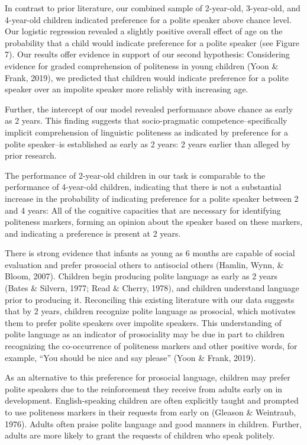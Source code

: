 \documentclass[
  english,
  man,floatsintext]{apa6}
\begin{document}
In contrast to prior literature, our combined sample of 2-year-old, 3-year-old, and 4-year-old children indicated preference for a polite speaker above chance level. Our logistic regression revealed a slightly positive overall effect of age on the probability that a child would indicate preference for a polite speaker (see Figure 7). Our results offer evidence in support of our second hypothesis: Considering evidence for graded comprehension of politeness in young children (Yoon \& Frank, 2019), we predicted that children would indicate preference for a polite speaker over an impolite speaker more reliably with increasing age.

Further, the intercept of our model revealed performance above chance as early as 2 years. This finding suggests that socio-pragmatic competence--specifically implicit comprehension of linguistic politeness as indicated by preference for a polite speaker--is established as early as 2 years: 2 years earlier than alleged by prior research.

The performance of 2-year-old children in our task is comparable to the performance of 4-year-old children, indicating that there is not a substantial increase in the probability of indicating preference for a polite speaker between 2 and 4 years: All of the cognitive capacities that are necessary for identifying politeness markers, forming an opinion about the speaker based on these markers, and indicating a preference is present at 2 years.

There is strong evidence that infants as young as 6 months are capable of social evaluation and prefer prosocial others to antisocial others (Hamlin, Wynn, \& Bloom, 2007). Children begin producing polite language as early as 2 years (Bates \& Silvern, 1977; Read \& Cherry, 1978), and children understand language prior to producing it. Reconciling this existing literature with our data suggests that by 2 years, children recognize polite language as prosocial, which motivates them to prefer polite speakers over impolite speakers. This understanding of polite language as an indicator of prosociality may be due in part to children recognizing the co-occurrence of politeness markers and other positive words, for example, ``You should be nice and say please'' (Yoon \& Frank, 2019).

As an alternative to this preference for prosocial language, children may prefer polite speakers due to the reinforcement they receive from adults early on in development. English-speaking children are often explicitly taught and prompted to use politeness markers in their requests from early on (Gleason \& Weintraub, 1976). Adults often praise polite language and good manners in children. Further, adults are more likely to grant the requests of children who speak politely.
\end{document}
